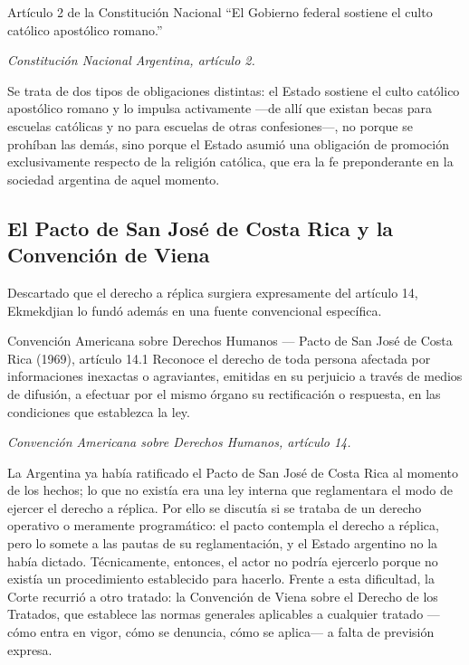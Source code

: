 \documentclass[12pt,oneside]{book}
\begin{document}
\begin{definition}{Artículo 2 de la Constitución Nacional}
``El Gobierno federal sostiene el culto católico apostólico romano.''

\textit{Constitución Nacional Argentina, artículo 2.}
\end{definition}

Se trata de dos tipos de obligaciones distintas: el Estado sostiene el culto católico apostólico romano y lo impulsa activamente —de allí que existan becas para escuelas católicas y no para escuelas de otras confesiones—, no porque se prohíban las demás, sino porque el Estado asumió una obligación de promoción exclusivamente respecto de la religión católica, que era la fe preponderante en la sociedad argentina de aquel momento.

\subsection{El Pacto de San José de Costa Rica y la Convención de Viena}

Descartado que el derecho a réplica surgiera expresamente del artículo 14, Ekmekdjian lo fundó además en una fuente convencional específica.

\begin{definition}{Convención Americana sobre Derechos Humanos --- Pacto de San José de Costa Rica (1969), artículo 14.1}
Reconoce el derecho de toda persona afectada por informaciones inexactas o agraviantes, emitidas en su perjuicio a través de medios de difusión, a efectuar por el mismo órgano su rectificación o respuesta, en las condiciones que establezca la ley.

\textit{Convención Americana sobre Derechos Humanos, artículo 14.}
\end{definition}

La Argentina ya había ratificado el Pacto de San José de Costa Rica al momento de los hechos; lo que no existía era una ley interna que reglamentara el modo de ejercer el derecho a réplica. Por ello se discutía si se trataba de un derecho operativo o meramente programático: el pacto contempla el derecho a réplica, pero lo somete a las pautas de su reglamentación, y el Estado argentino no la había dictado. Técnicamente, entonces, el actor no podría ejercerlo porque no existía un procedimiento establecido para hacerlo. Frente a esta dificultad, la Corte recurrió a otro tratado: la Convención de Viena sobre el Derecho de los Tratados, que establece las normas generales aplicables a cualquier tratado —cómo entra en vigor, cómo se denuncia, cómo se aplica— a falta de previsión expresa.
\end{document}
